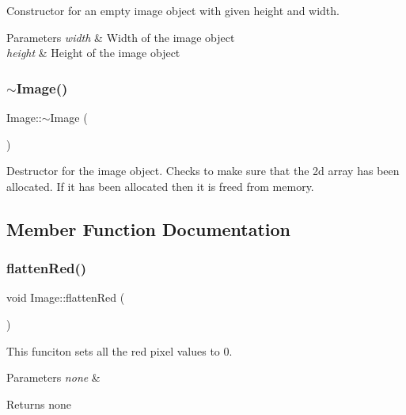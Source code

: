 Constructor for an empty image object with given height and width.


\begin{DoxyParams}{Parameters}
{\em width} & Width of the image object \\
\hline
{\em height} & Height of the image object \\
\hline
\end{DoxyParams}
\mbox{\label{class_image_a0294f63700543e11c0f0da85601c7ae5}} 
\subsubsection{\texorpdfstring{$\sim$\+Image()}{~Image()}}
{\footnotesize\ttfamily Image\+::$\sim$\+Image (\begin{DoxyParamCaption}{ }\end{DoxyParamCaption})}

Destructor for the image object. Checks to make sure that the 2d array has been allocated. If it has been allocated then it is freed from memory. 

\subsection{Member Function Documentation}
\mbox{\label{class_image_a95fc031a2d406d17d6b4dadff743cf7c}} 
\subsubsection{\texorpdfstring{flatten\+Red()}{flattenRed()}}
{\footnotesize\ttfamily void Image\+::flatten\+Red (\begin{DoxyParamCaption}{ }\end{DoxyParamCaption})}

This funciton sets all the red pixel values to 0.


\begin{DoxyParams}{Parameters}
{\em none} & \\
\hline
\end{DoxyParams}
\begin{DoxyReturn}{Returns}
none 
\end{DoxyReturn}
\mbox{\label{class_image_a82d860b94ad3e5250fb077e063ce3fa6}} 
